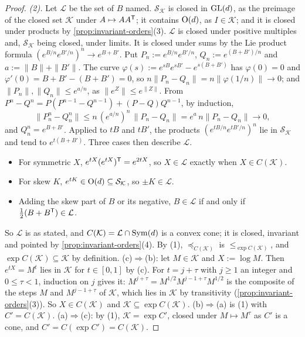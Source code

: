 \begin{proof}
\emph{(2).} Let $\mathcal L$ be the set of $B$ named. $\mathcal S_{\mathcal K}$ is closed in $\mathrm{GL}(d)$, as
the preimage of the closed set $\mathcal K$ under $A \mapsto AA^{\mathsf{T}}$; it contains $\mathrm{O}(d)$, as
$I \in \mathcal K$; and it is closed under products by \ref{prop:invariant-orders}(3). $\mathcal L$ is closed
under positive multiples and, $\mathcal S_{\mathcal K}$ being closed, under limits. It is closed under
sums by the Lie product formula $(e^{B/n}e^{B'/n})^n \to e^{B+B'}$. Put $P_n := e^{B/n}e^{B'/n}$,
$Q_n := e^{(B+B')/n}$ and $a := \|B\| + \|B'\|$. The curve $\varphi(s) := e^{sB}e^{sB'} - e^{s(B+B')}$ has
$\varphi(0) = 0$ and $\varphi'(0) = B + B' - (B + B') = 0$, so $n\|P_n - Q_n\| = n\|\varphi(1/n)\| \to 0$; and
$\|P_n\|, \|Q_n\| \le e^{a/n}$, as $\|e^Z\| \le e^{\|Z\|}$. From $P^n - Q^n = P(P^{n-1} - Q^{n-1}) + (P - Q)Q^{n-1}$,
by induction,
\[
  \|P_n^n - Q_n^n\| \le n\,(e^{a/n})^n\,\|P_n - Q_n\| = e^a\,n\|P_n - Q_n\| \to 0 ,
\]
and $Q_n^n = e^{B+B'}$. Applied to $tB$ and $tB'$, the products $(e^{tB/n}e^{tB'/n})^n$ lie in $\mathcal S_{\mathcal K}$ and tend to $e^{t(B+B')}$. Three cases then describe $\mathcal L$.
\begin{itemize}
\item For symmetric $X$, $e^{tX}(e^{tX})^{\mathsf{T}} = e^{2tX}$, so $X \in \mathcal L$ exactly when
$X \in C(\mathcal K)$.
\item For skew $K$, $e^{tK} \in \mathrm{O}(d) \subseteq \mathcal S_{\mathcal K}$, so $\pm K \in \mathcal L$.
\item Adding the skew part of $B$ or its negative, $B \in \mathcal L$ if and only if
$\frac12(B + B^{\mathsf{T}}) \in \mathcal L$.
\end{itemize} So $\mathcal L$ is as stated, and $C(\mathcal K) = \mathcal L \cap
\mathrm{Sym}(d)$ is a convex cone; it is closed, invariant and pointed by \ref{prop:invariant-orders}(4). By
(1), $\preceq_{C(\mathcal K)}$ is $\le_{\exp C(\mathcal K)}$, and $\exp C(\mathcal K) \subseteq \mathcal K$ by
definition. (c)$\Rightarrow$(b): let $M \in \mathcal K$ and $X := \log M$. Then $e^{tX} = M^t$ lies in
$\mathcal K$ for $t \in [0,1]$ by (c). For $t = j + \tau$ with $j \ge 1$ an integer and $0 \le \tau < 1$,
induction on $j$ gives it: $M^{j+\tau} = M^{1/2}M^{j-1+\tau}M^{1/2}$ is the composite of the steps $M$ and
$M^{j-1+\tau}$ of $\mathcal K$, which lies in $\mathcal K$ by transitivity
(\ref{prop:invariant-orders}(3)). So $X \in C(\mathcal K)$ and $\mathcal K \subseteq \exp C(\mathcal K)$. (b)$\Rightarrow$(a) is (1) with $C' = C(\mathcal K)$.
(a)$\Rightarrow$(c): by (1), $\mathcal K = \exp C'$, closed under $M \mapsto M^\tau$ as $C'$ is a cone, and
$C' = C(\exp C') = C(\mathcal K)$.


\end{proof}
